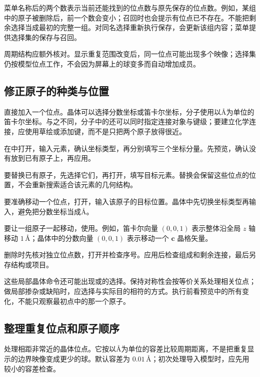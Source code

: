 菜单名称后的两个数表示当前还能找到的位点数与原先保存的位点数。例如，某组中的原子被删除后，前一个数会变小；召回时也会提示有位点已不存在。不能把剩余选择当成最初的完整一组。对同名选择重新执行保存，会更新该组内容；菜单提供选择集的保存与召回。

周期结构应额外核对。显示重复范围改变后，同一位点可能出现多个映像；选择集仍按模型位点工作，不会因为屏幕上的球变多而自动增加成员。

\subsection{修正原子的种类与位置}\label{sec:atom-edit-reference}

直接加入一个位点。晶体可以选择分数坐标或笛卡尔坐标，分子使用以\AA 为单位的笛卡尔坐标。与之不同，分子中的还可以同时指定连接对象与键级；要建立化学连接，应使用草绘或添加键，而不是只把两个原子放得很近。

\begin{steps}
  \item 在中打开，输入元素，确认坐标类型，再分别填写三个坐标分量。先预览，确认没有放到已有原子上，再应用。
  \item 要替换已有原子，先选择它们，再打开，填写目标元素。替换会保留这些位点的位置，不会重新搜索适合该元素的几何结构。
  \item 要准确移动一个位点，打开，输入该原子的目标位置。晶体中先切换坐标类型再输入，避免把分数坐标当成\AA。
  \item 要让一组原子一起移动，使用。例如，笛卡尔向量 \((0,0,1)\) 表示整体沿全局 $z$ 轴移动 $1\,\text{\AA}$；晶体中的分数向量 \((0,0,1)\) 表示移动一个 $\mathbf c$ 晶格矢量。
  \item 删除时先核对独立位点数，打开并检查序号。应用后检查组成和剩余连接，最后另存结构或项目。
\end{steps}

这些局部晶体命令还可能出现或的选择。保持对称性会按等价关系处理相关位点；做局部掺杂或缺陷时，应选择与实际目的相符的方式。执行前看预览中的所有变化，不能只观察最初点中的那一个原子。

\subsection{整理重复位点和原子顺序}\label{sec:atom-clean-reference}

处理相距非常近的晶体位点。它按以\AA 为单位的容差比较周期距离，不是把重复显示的边界映像变成更少的球。默认容差为 $0.01\,\text{\AA}$；初次处理导入模型时，应先用较小的容差检查。

